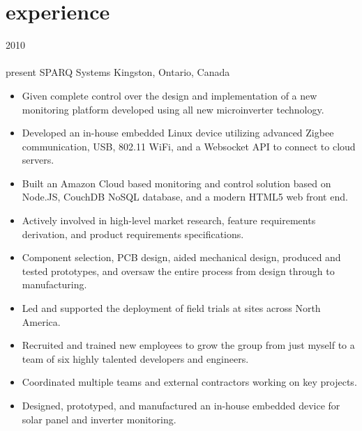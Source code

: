 
\section{experience}

\begin{entrylist}
\entry
  {2010\\\faChevronDown\\{\bodyfontit present}}
  {SPARQ Systems}
  {Kingston, Ontario, Canada}
  {
\begin{itemize}[leftmargin=12pt]
	\item Given complete control over the design and implementation of a new monitoring platform developed using all new microinverter technology.
  \item Developed an in-house {\bodyfontit embedded Linux} device utilizing advanced {\bodyfontit Zigbee} communication, USB, 802.11 {\bodyfontit WiFi}, and a {\bodyfontit Websocket} API to connect to cloud servers.
  \item Built an Amazon {\bodyfontit Cloud} based monitoring and control solution based on {\bodyfontit Node.JS}, CouchDB {\bodyfontit NoSQL} database, and a modern {\bodyfontit HTML5} web front end.
	\item Actively involved in high-level market research, feature requirements derivation, and product requirements specifications.
	\item Component selection, {\bodyfontit PCB} design, aided mechanical design, produced and tested {\bodyfontit prototypes}, and oversaw the entire process from {\bodyfontit design} through to {\bodyfontit manufacturing}.
  \item Led and supported the deployment of field trials at sites across North America.
	\item Recruited and trained new employees to grow the group from just myself to a team of six highly talented developers and engineers.
	\item Coordinated multiple teams and external contractors working on key projects.
\end{itemize}
\begin{itemize}[leftmargin=12pt]
	\item Designed, prototyped, and manufactured an in-house embedded device for solar panel and inverter monitoring.

\end{itemize}}
\end{entrylist}
